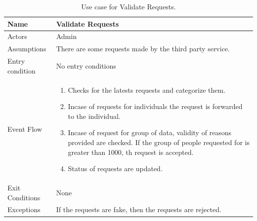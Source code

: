 
\begin{table}[H]
\begin{tabular}{| l | p{} |}
\hline
Name & Validate Requests\\
\hline
Actors & Admin\\
\hline
Assumptions & There are some requests made by the third party service.\\
\hline
Entry condition & No entry conditions\\
\hline
Event Flow & \begin{enumerate}
\item Checks for the latests requests and categorize them. 
\item Incase of requests for individuals the request is forwarded to the individual.
\item Incase of request for group of data, validity of reasons provided are checked. If the group of people requested for is greater than 1000, th request is accepted. 
\item Status of requests are updated.
\end{enumerate}
\\
\hline
Exit Conditions & None\\
\hline
Exceptions & If the requests are fake, then the requests are rejected. \\
\hline
\end{tabular}
\caption{Use case for Validate Requests.}
\label{usecase-validate-requests}
\end{table}

